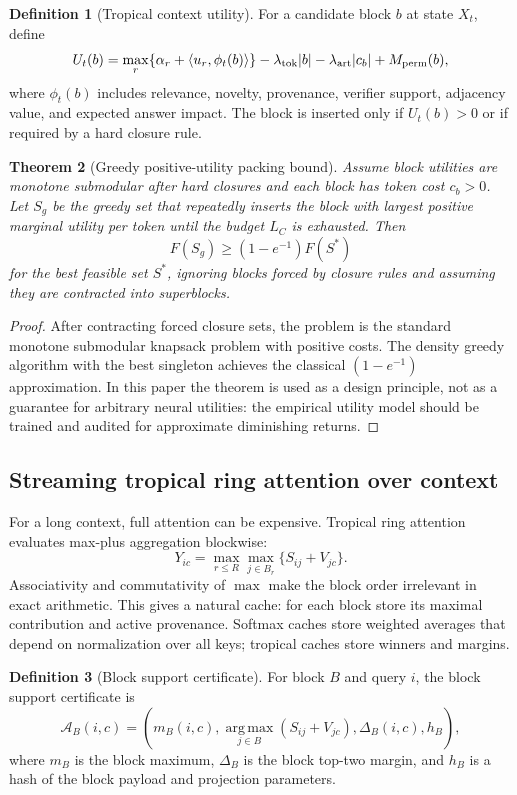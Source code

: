 \documentclass[11pt]{article}
\newtheorem{theorem}{Theorem}[section]
\theoremstyle{definition}
\newtheorem{definition}[theorem]{Definition}
\theoremstyle{remark}
\newcommand{\argmax}{\operatorname*{arg\,max}}
\newcommand{\LC}{L_C}
\begin{document}
\begin{definition}[Tropical context utility]
For a candidate block \(b\) at state \(X_t\), define
\[
    U_t(b)=\max_r\{\alpha_r+\langle u_r,\phi_t(b)\rangle\}-\lambda_{\rm tok}|b|-\lambda_{\rm art}|c_b|+M_{\rm perm}(b),
\]
where \(\phi_t(b)\) includes relevance, novelty, provenance, verifier support, adjacency value, and expected answer impact. The block is inserted only if \(U_t(b)>0\) or if required by a hard closure rule.
\end{definition}

\begin{theorem}[Greedy positive-utility packing bound]
Assume block utilities are monotone submodular after hard closures and each block has token cost \(c_b>0\). Let \(S_g\) be the greedy set that repeatedly inserts the block with largest positive marginal utility per token until the budget \(\LC\) is exhausted. Then
\[
    F(S_g)\ge (1-e^{-1})F(S^*)
\]
for the best feasible set \(S^*\), ignoring blocks forced by closure rules and assuming they are contracted into superblocks.
\end{theorem}
\begin{proof}
After contracting forced closure sets, the problem is the standard monotone submodular knapsack problem with positive costs. The density greedy algorithm with the best singleton achieves the classical \((1-e^{-1})\) approximation. In this paper the theorem is used as a design principle, not as a guarantee for arbitrary neural utilities: the empirical utility model should be trained and audited for approximate diminishing returns.
\end{proof}

\subsection{Streaming tropical ring attention over context}

For a long context, full attention can be expensive. Tropical ring attention evaluates max-plus aggregation blockwise:
\[
    Y_{ic}=\max_{r\le R}\max_{j\in B_r}\{S_{ij}+V_{jc}\}.
\]
Associativity and commutativity of \(\max\) make the block order irrelevant in exact arithmetic. This gives a natural cache: for each block store its maximal contribution and active provenance. Softmax caches store weighted averages that depend on normalization over all keys; tropical caches store winners and margins.

\begin{definition}[Block support certificate]
For block \(B\) and query \(i\), the block support certificate is
\[
    \mathcal A_B(i,c)=\left(m_B(i,c),\argmax_{j\in B}(S_{ij}+V_{jc}),\Delta_B(i,c),h_B\right),
\]
where \(m_B\) is the block maximum, \(\Delta_B\) is the block top-two margin, and \(h_B\) is a hash of the block payload and projection parameters.
\end{definition}
\end{document}
